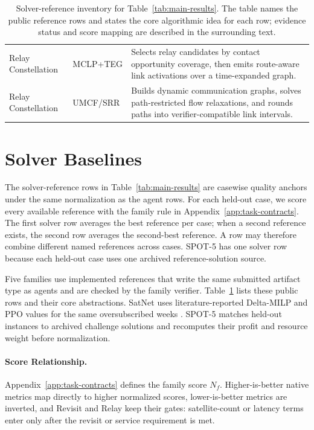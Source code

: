 \documentclass[11pt]{article}
\begin{document}
\begin{table}[!t]
\begin{tabular}{>{\raggedright\arraybackslash}p{}>{\raggedright\arraybackslash}p{}>{\raggedright\arraybackslash}p{}}
Relay Constellation & MCLP+TEG & Selects relay candidates by contact opportunity coverage, then emits route-aware link activations over a time-expanded graph. \\
Relay Constellation & UMCF/SRR & Builds dynamic communication graphs, solves path-restricted flow relaxations, and rounds paths into verifier-compatible link intervals. \\
\hline
\end{tabular}
\caption{Solver-reference inventory for Table~\ref{tab:main-results}. The table names the public reference rows and states the core algorithmic idea for each row; evidence status and score mapping are described in the surrounding text.}
\label{tab:solver-baseline-inventory}
\end{table}

\section{Solver Baselines}
\label{app:solver-baselines}

The solver-reference rows in Table~\ref{tab:main-results} are casewise quality anchors under the same normalization as the agent rows. For each held-out case, we score every available reference with the family rule in Appendix~\ref{app:task-contracts}. The first solver row averages the best reference per case; when a second reference exists, the second row averages the second-best reference. A row may therefore combine different named references across cases. SPOT-5 has one solver row because each held-out case uses one archived reference-solution source.

Five families use implemented references that write the same submitted artifact type as agents and are checked by the family verifier. Table~\ref{tab:solver-baseline-inventory} lists these public rows and their core abstractions. SatNet uses literature-reported Delta-MILP and PPO values for the same oversubscribed weeks \citep{claudet2021delta,goh2021satnet}. SPOT-5 matches held-out instances to archived challenge solutions and recomputes their profit and resource weight before normalization.

\paragraph{Score Relationship.} Appendix~\ref{app:task-contracts} defines the family score \(N_f\). Higher-is-better native metrics map directly to higher normalized scores, lower-is-better metrics are inverted, and Revisit and Relay keep their gates: satellite-count or latency terms enter only after the revisit or service requirement is met.
\end{document}
